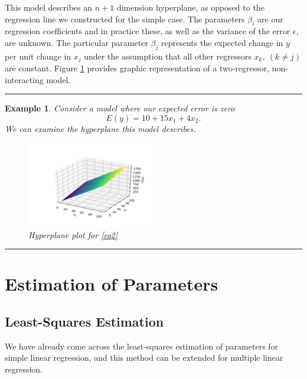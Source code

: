 \documentclass[10pt,a4paper, twocolumn, conference]{IEEEtran}
\theoremstyle{own}
\newtheorem{example}{Example}
\theoremstyle{definition}
\theoremstyle{plain}
\begin{document}
This model describes an $n + 1$ dimension hyperplane, as opposed to the regression line we constructed for the simple case. The parameters $\beta_i$ are our regression coefficients and in practice these, as well as the variance of the error $\epsilon$, are unknown. The particular parameter $\beta_j$ represents the expected change in $y$ per unit change in $x_j$ under the assumption that all other regressors $x_k,~( k \neq j )$ are constant. Figure \ref{fig1} provides graphic representation of a two-regressor, non-interacting model.
\vspace{2mm}
\hrule
\begin{example}
Consider a model where our expected error is zero
\begin{equation} \label{eq2}
E(y) = 10 + 15x_1 + 4x_2.
\end{equation}
We can examine the hyperplane this model describes.
\begin{figure}[H]
\centering
\includegraphics[width = 0.5\textwidth]{f4}
\caption{Hyperplane plot for \cref{eq2}}
\label{fig1}
\end{figure}
\end{example}
\hrule
\vspace{2mm}
\section{Estimation of Parameters}
\subsection{Least-Squares Estimation}
We have already come across the least-squares estimation of parameters for simple linear regression, and this method can be extended for multiple linear regression.
\end{document}
